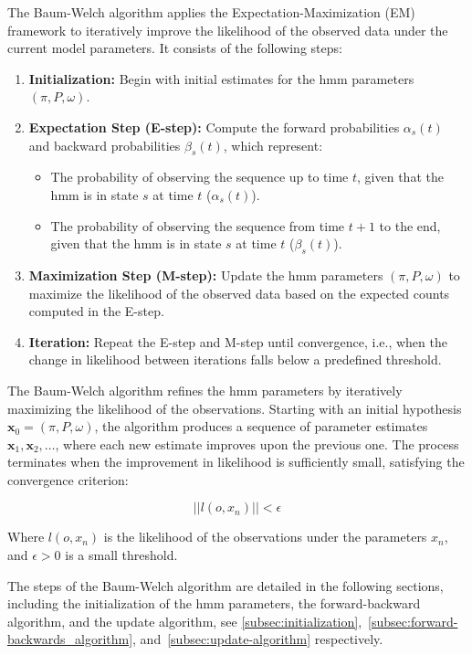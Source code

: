 The Baum-Welch algorithm applies the Expectation-Maximization (EM) framework to iteratively improve the likelihood of the observed data under the current model parameters.
It consists of the following steps:

\begin{enumerate}
    \item \textbf{Initialization:} Begin with initial estimates for the \gls{hmm} parameters $(\pi, P, \omega)$.
    \item \textbf{Expectation Step (E-step):}
    Compute the forward probabilities $\alpha_s(t)$ and backward probabilities $\beta_s(t)$, which represent:
    \begin{itemize}
        \item The probability of observing the sequence up to time $t$, given that the \gls{hmm} is in state $s$ at time $t$ ($\alpha_s(t)$).
        \item The probability of observing the sequence from time $t+1$ to the end, given that the \gls{hmm} is in state $s$ at time $t$ ($\beta_s(t)$).
    \end{itemize}
    \item \textbf{Maximization Step (M-step):} Update the \gls{hmm} parameters $(\pi, P, \omega)$ to maximize the likelihood of the observed data based on the expected counts computed in the E-step.
    \item \textbf{Iteration:} Repeat the E-step and M-step until convergence, i.e., when the change in likelihood between iterations falls below a predefined threshold.
\end{enumerate}
The Baum-Welch algorithm refines the \gls{hmm} parameters by iteratively maximizing the likelihood of the observations.
Starting with an initial hypothesis $\textbf{x}_0 = (\pi, P, \omega)$, the algorithm produces a sequence of parameter estimates $\textbf{x}_1, \textbf{x}_2, \ldots$, where each new estimate improves upon the previous one.
The process terminates when the improvement in likelihood is sufficiently small, satisfying the convergence criterion:

\[
    ||l(o,x_n)|| < \epsilon
\]

Where $l(o, x_n)$ is the likelihood of the observations under the parameters $x_n$, and $\epsilon > 0$ is a small threshold.

The steps of the Baum-Welch algorithm are detailed in the following sections, including the initialization of the \gls{hmm} parameters, the forward-backward algorithm, and the update algorithm, see \autoref{subsec:initialization},~\ref{subsec:forward-backwards_algorithm}, and~\ref{subsec:update-algorithm} respectively.


